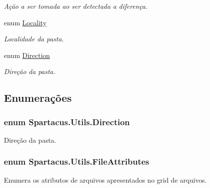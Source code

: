 \begin{DoxyCompactItemize}
\begin{DoxyCompactList}\small\item\em Ação a ser tomada ao ser detectada a diferença. \end{DoxyCompactList}\item 
enum \hyperlink{namespaceSpartacus_1_1Utils_a64d6efe7b3923d4631036138e1b8b57f}{Locality} 
\begin{DoxyCompactList}\small\item\em Localidade da pasta. \end{DoxyCompactList}\item 
enum \hyperlink{namespaceSpartacus_1_1Utils_a71ccbdd8fb504defa1e9ea38771651e5}{Direction} 
\begin{DoxyCompactList}\small\item\em Direção da pasta. \end{DoxyCompactList}\end{DoxyCompactItemize}


\subsection{Enumerações}
\hypertarget{namespaceSpartacus_1_1Utils_a71ccbdd8fb504defa1e9ea38771651e5}{
\subsubsection[{Direction}]{\setlength{\rightskip}{0pt plus 5cm}enum {\bf Spartacus.\+Utils.\+Direction}}}\label{namespaceSpartacus_1_1Utils_a71ccbdd8fb504defa1e9ea38771651e5}


Direção da pasta. 

\hypertarget{namespaceSpartacus_1_1Utils_a81ab9f259fbae2db00ea1cd29690a6cf}{
\subsubsection[{File\+Attributes}]{\setlength{\rightskip}{0pt plus 5cm}enum {\bf Spartacus.\+Utils.\+File\+Attributes}}}\label{namespaceSpartacus_1_1Utils_a81ab9f259fbae2db00ea1cd29690a6cf}


Enumera os atributos de arquivos apresentados no grid de arquivos. 


